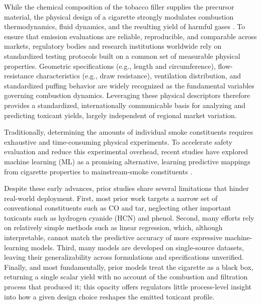 ﻿\documentclass[a4paper,fleqn]{cas-sc}
\begin{document}
While the chemical composition of the tobacco filler supplies the precursor material, the physical design of a cigarette strongly modulates combustion thermodynamics, fluid dynamics, and the resulting yield of harmful gases \cite{BAKER2006373, OConnor2008CigaretteDesign, PMID27222918}. To ensure that emission evaluations are reliable, reproducible, and comparable across markets, regulatory bodies and research institutions worldwide rely on standardized testing protocols built on a common set of measurable physical properties. Geometric specifications (e.g., length and circumference), flow-resistance characteristics (e.g., draw resistance), ventilation distribution, and standardized puffing behavior are widely recognized as the fundamental variables governing combustion dynamics. Leveraging these physical descriptors therefore provides a standardized, internationally communicable basis for analyzing and predicting toxicant yields, largely independent of regional market variation.

Traditionally, determining the amounts of individual smoke constituents requires exhaustive and time-consuming physical experiments. To accelerate safety evaluation and reduce this experimental overhead, recent studies have explored machine learning (ML) as a promising alternative, learning predictive mappings from cigarette properties to mainstream-smoke constituents \cite{yang2022demislim, he2023multifactor, wan2026homogeneity, Zhu2025transformer, Hannel2019AnAF}.

Despite these early advances, prior studies share several limitations that hinder real-world deployment. First, most prior work targets a narrow set of conventional constituents such as CO and tar, neglecting other important toxicants such as hydrogen cyanide (HCN) and phenol. Second, many efforts rely on relatively simple methods such as linear regression, which, although interpretable, cannot match the predictive accuracy of more expressive machine-learning models. Third, many models are developed on single-source datasets, leaving their generalizability across formulations and specifications unverified. Finally, and most fundamentally, prior models treat the cigarette as a black box, returning a single scalar yield with no account of the combustion and filtration process that produced it; this opacity offers regulators little process-level insight into how a given design choice reshapes the emitted toxicant profile.
\end{document}

